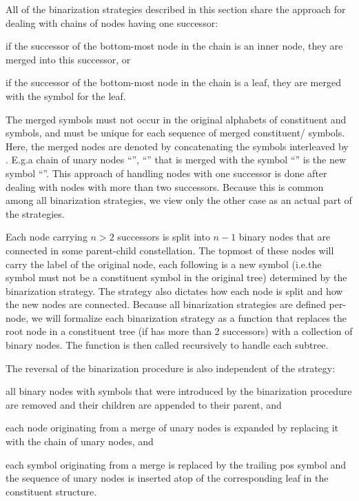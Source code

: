 \documentclass[../document.tex]{subfiles}
\begin{document}
    All of the binarization strategies described in this section share the approach for dealing with chains of nodes having one successor:
    \begin{inparaenum}
        \item if the successor of the bottom-most node in the chain is an inner node, they are merged into this successor, or
        \item if the successor of the bottom-most node in the chain is a leaf, they are merged with the  symbol for the leaf.
    \end{inparaenum}
    The merged symbols must not occur in the original alphabets of constituent and  symbols, and must be unique for each sequence of merged constituent/ symbols.
    Here, the merged nodes are denoted by concatenating the symbols interleaved by \cn{+}.
    E.g.\@ a chain of unary nodes ``'', ``'' that is merged with the  symbol ``'' is the new symbol ``''.
    This approach of handling nodes with one successor is done after dealing with nodes with more than two successors.
    Because this is common among all binarization strategies, we view only the other case as an actual part of the strategies.

    Each node carrying \( n > 2 \) successors is split into \( n-1 \) binary nodes that are connected in some parent-child constellation.
    The topmost of these nodes will carry the label of the original node, each following is a new symbol (i.e.\@ the symbol must not be a constituent symbol in the original tree) determined by the binarization strategy.
    The strategy also dictates how each node is split and how the new nodes are connected.
    Because all binarization strategies are defined per-node, we will formalize each binarization strategy as a function that replaces the root node in a constituent tree (if has more than 2 successors) with a collection of binary nodes.
    The function is then called recursively to handle each subtree.

    The reversal of the binarization procedure is also independent of the strategy:
    \begin{compactenum}
        \item all binary nodes with symbols that were introduced by the binarization procedure are removed and their children are appended to their parent, and
        \item each node originating from a merge of unary nodes is expanded by replacing it with the chain of unary nodes, and
        \item each  symbol originating from a merge is replaced by the trailing pos symbol and the sequence of unary nodes is inserted atop of the corresponding leaf in the constituent structure.
    \end{compactenum}
\end{document}
